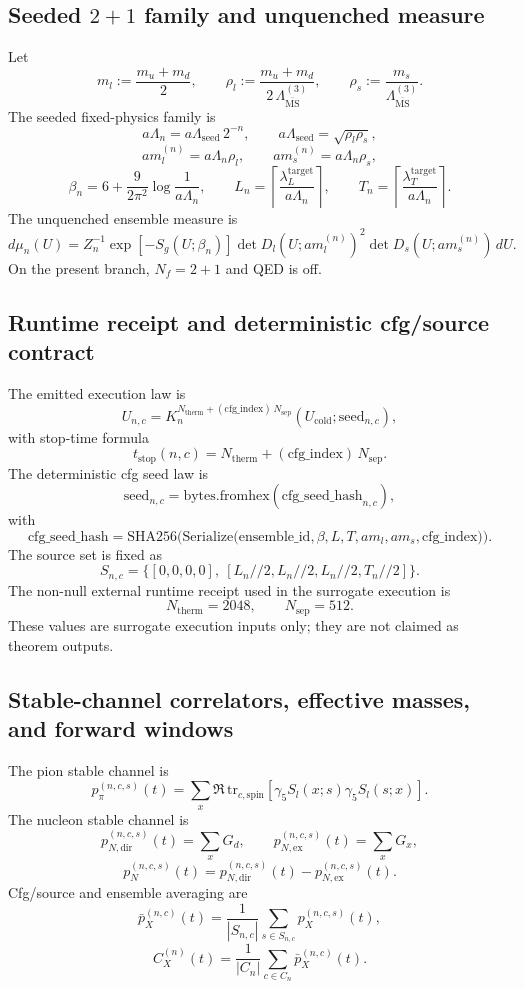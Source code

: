 \documentclass[11pt]{article}
\begin{document}
\subsection{Seeded \(2+1\) family and unquenched measure}

Let
\[
m_l := \frac{m_u+m_d}{2},
\qquad
\rho_l := \frac{m_u+m_d}{2\,\Lambda_{\overline{\mathrm{MS}}}^{(3)}},
\qquad
\rho_s := \frac{m_s}{\Lambda_{\overline{\mathrm{MS}}}^{(3)}}.
\]
The seeded fixed-physics family is
\[
a\Lambda_n = a\Lambda_{\mathrm{seed}}\,2^{-n},
\qquad
a\Lambda_{\mathrm{seed}} = \sqrt{\rho_l \rho_s},
\]
\[
a m_l^{(n)} = a\Lambda_n \rho_l,
\qquad
a m_s^{(n)} = a\Lambda_n \rho_s,
\]
\[
\beta_n = 6 + \frac{9}{2\pi^2}\log\!\frac{1}{a\Lambda_n},
\qquad
L_n = \left\lceil \frac{\lambda_L^{\mathrm{target}}}{a\Lambda_n}\right\rceil,
\qquad
T_n = \left\lceil \frac{\lambda_T^{\mathrm{target}}}{a\Lambda_n}\right\rceil.
\]
The unquenched ensemble measure is
\[
d\mu_n(U)
=
Z_n^{-1}
\exp[-S_g(U;\beta_n)]
\det D_l(U; a m_l^{(n)})^2
\det D_s(U; a m_s^{(n)})
\,dU.
\]
On the present branch, \(N_f=2+1\) and QED is off.

\subsection{Runtime receipt and deterministic cfg/source contract}

The emitted execution law is
\[
U_{n,c}
=
K_n^{N_{\mathrm{therm}} + (\mathrm{cfg\_index})\,N_{\mathrm{sep}}}(U_{\mathrm{cold}}; \mathrm{seed}_{n,c}),
\]
with stop-time formula
\[
t_{\mathrm{stop}}(n,c)
=
N_{\mathrm{therm}} + (\mathrm{cfg\_index})\,N_{\mathrm{sep}}.
\]
The deterministic cfg seed law is
\[
\mathrm{seed}_{n,c}
=
\mathrm{bytes.fromhex}(\mathrm{cfg\_seed\_hash}_{n,c}),
\]
with
\[
\mathrm{cfg\_seed\_hash}
=
\mathrm{SHA256}\!\Big(
\mathrm{Serialize}\!\big(
\mathrm{ensemble\_id},\beta,L,T,a m_l,a m_s,\mathrm{cfg\_index}
\big)
\Big).
\]
The source set is fixed as
\[
S_{n,c} = \{ [0,0,0,0],\ [L_n//2, L_n//2, L_n//2, T_n//2] \}.
\]
The non-null external runtime receipt used in the surrogate execution is
\[
N_{\mathrm{therm}} = 2048,
\qquad
N_{\mathrm{sep}} = 512.
\]
These values are surrogate execution inputs only; they are not claimed as theorem outputs.

\subsection{Stable-channel correlators, effective masses, and forward windows}

The pion stable channel is
\[
p_\pi^{(n,c,s)}(t)
=
\sum_x \Re\,\mathrm{tr}_{c,\mathrm{spin}}
\left[
\gamma_5 S_l(x;s)\gamma_5 S_l(s;x)
\right].
\]
The nucleon stable channel is
\[
p_{N,\mathrm{dir}}^{(n,c,s)}(t) = \sum_x G_d,
\qquad
p_{N,\mathrm{ex}}^{(n,c,s)}(t) = \sum_x G_x,
\]
\[
p_N^{(n,c,s)}(t)
=
p_{N,\mathrm{dir}}^{(n,c,s)}(t) - p_{N,\mathrm{ex}}^{(n,c,s)}(t).
\]
Cfg/source and ensemble averaging are
\[
\bar p_X^{(n,c)}(t)
=
\frac{1}{|S_{n,c}|}\sum_{s\in S_{n,c}} p_X^{(n,c,s)}(t),
\]
\[
C_X^{(n)}(t)
=
\frac{1}{|C_n|}\sum_{c\in C_n} \bar p_X^{(n,c)}(t).
\]
\end{document}
